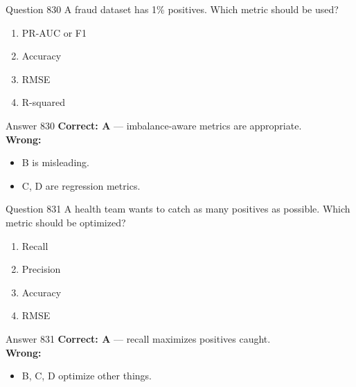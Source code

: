 \documentclass[aspectratio=169,11pt]{beamer}
\begin{document}
	\begin{frame}{Question 830}
		A fraud dataset has 1\% positives. Which metric should be used?
		\begin{enumerate}[label=\Alph*.]
			\item PR-AUC or F1
			\item Accuracy
			\item RMSE
			\item R-squared
		\end{enumerate}
	\end{frame}
	\begin{frame}{Answer 830}
		\textbf{Correct: A} --- imbalance-aware metrics are appropriate.\\
		\vspace{0.5em}
		\textbf{Wrong:}
		\begin{itemize}
			\item B is misleading.
			\item C, D are regression metrics.
		\end{itemize}
	\end{frame}
	
	\begin{frame}{Question 831}
		A health team wants to catch as many positives as possible. Which metric should be optimized?
		\begin{enumerate}[label=\Alph*.]
			\item Recall
			\item Precision
			\item Accuracy
			\item RMSE
		\end{enumerate}
	\end{frame}
	\begin{frame}{Answer 831}
		\textbf{Correct: A} --- recall maximizes positives caught.\\
		\vspace{0.5em}
		\textbf{Wrong:}
		\begin{itemize}
			\item B, C, D optimize other things.
		\end{itemize}
	\end{frame}
	
\end{document}
